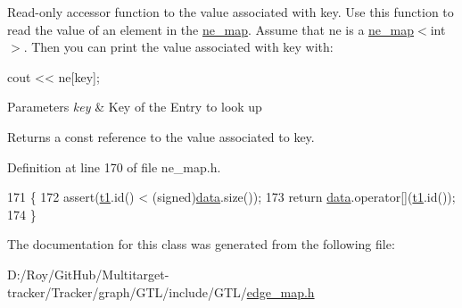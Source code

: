 Read-\/only accessor function to the value associated with {\ttfamily key}. Use this function to read the value of an element in the {\ttfamily \mbox{\hyperlink{classne__map}{ne\+\_\+map}}}. Assume that {\ttfamily ne} is a {\ttfamily \mbox{\hyperlink{classne__map}{ne\+\_\+map}}$<$int$>$}. Then you can print the value associated with {\ttfamily key} with\+: 
\begin{DoxyPre}
  cout << ne[key];
\end{DoxyPre}



\begin{DoxyParams}{Parameters}
{\em key} & Key of the Entry to look up \\
\hline
\end{DoxyParams}
\begin{DoxyReturn}{Returns}
a const reference to the value associated to {\ttfamily key}. 
\end{DoxyReturn}


Definition at line 170 of file ne\+\_\+map.\+h.


\begin{DoxyCode}
171 \{
172     assert(\mbox{\hyperlink{gml2nestedsql_8cpp_a214bd1a0500f5739ce581a8bcffb518a}{t1}}.id() < (signed)\mbox{\hyperlink{classne__map_af73307678e05a9c24c084d98b267afa8}{data}}.size());
173     \textcolor{keywordflow}{return} \mbox{\hyperlink{classne__map_af73307678e05a9c24c084d98b267afa8}{data}}.operator[](\mbox{\hyperlink{gml2nestedsql_8cpp_a214bd1a0500f5739ce581a8bcffb518a}{t1}}.id());
174 \}
\end{DoxyCode}


The documentation for this class was generated from the following file\+:\begin{DoxyCompactItemize}
\item 
D\+:/\+Roy/\+Git\+Hub/\+Multitarget-\/tracker/\+Tracker/graph/\+G\+T\+L/include/\+G\+T\+L/\mbox{\hyperlink{edge__map_8h}{edge\+\_\+map.\+h}}\end{DoxyCompactItemize}
